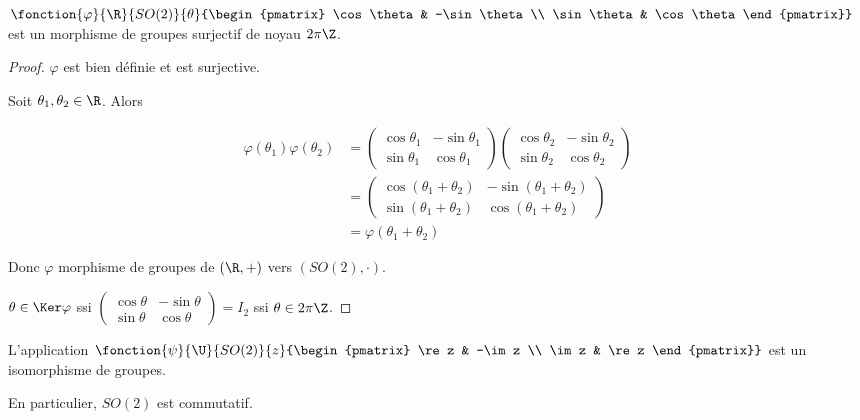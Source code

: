 \begin{theoreme}{}{}
    $\fonction{\varphi}{\R}{SO(2)}{\theta}{\begin{pmatrix}
        \cos \theta & -\sin \theta \\
        \sin \theta & \cos \theta
    \end{pmatrix}}$ est un morphisme de groupes surjectif de noyau $2 \pi \Z$.
\end{theoreme}

\begin{proof}
    $\varphi$ est bien définie et est surjective. 

    Soit $\theta_1, \theta_2 \in \R$. Alors 
    
    \begin{align}
        \varphi(\theta_1) \varphi(\theta_2) & = \begin{pmatrix}
        \cos \theta_1 & -\sin \theta_1 \\
        \sin \theta_1 & \cos \theta_1
        \end{pmatrix} \begin{pmatrix}
            \cos \theta_2 & -\sin \theta_2 \\
            \sin \theta_2 & \cos \theta_2
        \end{pmatrix} \\
        & = \begin{pmatrix}
            \cos (\theta_1 + \theta_2) & -\sin (\theta_1 + \theta_2) \\
            \sin (\theta_1 + \theta_2) & \cos (\theta_1 + \theta_2)
        \end{pmatrix} \\
        &  = \varphi(\theta_1 + \theta_2)
    \end{align}

    Donc $\varphi$ morphisme de groupes de $(\R, +)$ vers $(SO(2), \cdot)$.

    $\theta \in \Ker \varphi$ ssi $\begin{pmatrix}
        \cos \theta & -\sin \theta \\
        \sin \theta & \cos \theta
    \end{pmatrix} = I_2$ ssi $\theta \in 2 \pi \Z$.
\end{proof}

\begin{theoreme}{}{}
    L'application $\fonction{\psi}{\U}{SO(2)}{z}{\begin{pmatrix}
        \re z & -\im z \\
        \im z & \re z
    \end{pmatrix}}$ est un isomorphisme de groupes. 

    En particulier, $SO(2)$ est commutatif. 
\end{theoreme}

